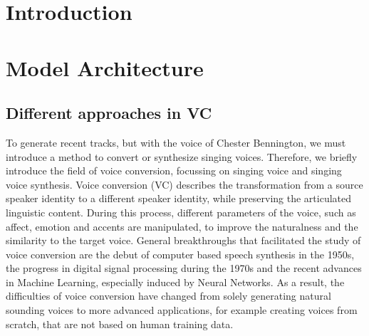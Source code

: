 \documentclass[a4paper]{article}
\subtitle \\
\author{\StudNumeOne}
\begin{document}
	
	\section*{Introduction}
	
	
	\section{Model Architecture}
	
	\subsection{Different approaches in VC}
	
	To generate recent tracks, but with the voice of Chester Bennington, we must introduce a method to convert or synthesize singing voices. Therefore, we briefly introduce the field of voice conversion, focussing on singing voice and singing voice synthesis. Voice conversion (VC) describes the transformation from a source speaker identity to a different speaker identity, while preserving the articulated linguistic content. During this process, different parameters of the voice, such as affect, emotion and accents are manipulated, to improve the naturalness and the similarity to the target voice. General breakthroughs that facilitated the study of voice conversion are the debut of computer based speech synthesis in the 1950s, the progress in digital signal processing during the 1970s and the recent advances in Machine Learning, especially induced by Neural Networks. \cite{Sisman2020} As a result, the difficulties of voice conversion have changed from solely generating natural sounding voices to more advanced applications, for example creating voices from scratch, that are not based on human training data. 
	
\end{document}
